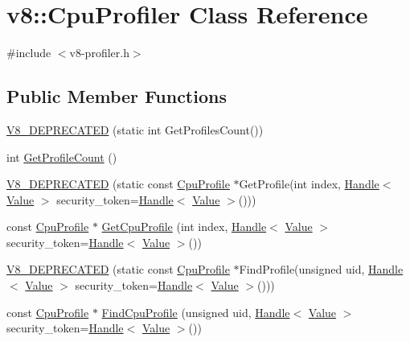 \hypertarget{classv8_1_1_cpu_profiler}{}\section{v8\+:\+:Cpu\+Profiler Class Reference}
\label{classv8_1_1_cpu_profiler}


{\ttfamily \#include $<$v8-\/profiler.\+h$>$}

\subsection*{Public Member Functions}
\begin{DoxyCompactItemize}
\item 
\hyperlink{classv8_1_1_cpu_profiler_affe0b8d2eda5a298f5d6ca68c022741e}{V8\+\_\+\+D\+E\+P\+R\+E\+C\+A\+T\+E\+D} (static int Get\+Profiles\+Count())
\item 
int \hyperlink{classv8_1_1_cpu_profiler_af49a7c17dfdb194c8bbe2351519575d7}{Get\+Profile\+Count} ()
\item 
\hyperlink{classv8_1_1_cpu_profiler_a42f0678a5b10a7b10924b5347f8dcc88}{V8\+\_\+\+D\+E\+P\+R\+E\+C\+A\+T\+E\+D} (static const \hyperlink{classv8_1_1_cpu_profile}{Cpu\+Profile} $\ast$Get\+Profile(int index, \hyperlink{classv8_1_1_handle}{Handle}$<$ \hyperlink{classv8_1_1_value}{Value} $>$ security\+\_\+token=\hyperlink{classv8_1_1_handle}{Handle}$<$ \hyperlink{classv8_1_1_value}{Value} $>$()))
\item 
const \hyperlink{classv8_1_1_cpu_profile}{Cpu\+Profile} $\ast$ \hyperlink{classv8_1_1_cpu_profiler_aa480771f4ca0a0cfe0229f850b12559e}{Get\+Cpu\+Profile} (int index, \hyperlink{classv8_1_1_handle}{Handle}$<$ \hyperlink{classv8_1_1_value}{Value} $>$ security\+\_\+token=\hyperlink{classv8_1_1_handle}{Handle}$<$ \hyperlink{classv8_1_1_value}{Value} $>$())
\item 
\hyperlink{classv8_1_1_cpu_profiler_a16385e0cddd45475d2eecfa967302749}{V8\+\_\+\+D\+E\+P\+R\+E\+C\+A\+T\+E\+D} (static const \hyperlink{classv8_1_1_cpu_profile}{Cpu\+Profile} $\ast$Find\+Profile(unsigned uid, \hyperlink{classv8_1_1_handle}{Handle}$<$ \hyperlink{classv8_1_1_value}{Value} $>$ security\+\_\+token=\hyperlink{classv8_1_1_handle}{Handle}$<$ \hyperlink{classv8_1_1_value}{Value} $>$()))
\item 
const \hyperlink{classv8_1_1_cpu_profile}{Cpu\+Profile} $\ast$ \hyperlink{classv8_1_1_cpu_profiler_a31326b80e3a996099b6eba13444452bc}{Find\+Cpu\+Profile} (unsigned uid, \hyperlink{classv8_1_1_handle}{Handle}$<$ \hyperlink{classv8_1_1_value}{Value} $>$ security\+\_\+token=\hyperlink{classv8_1_1_handle}{Handle}$<$ \hyperlink{classv8_1_1_value}{Value} $>$())

\end{DoxyCompactItemize}
